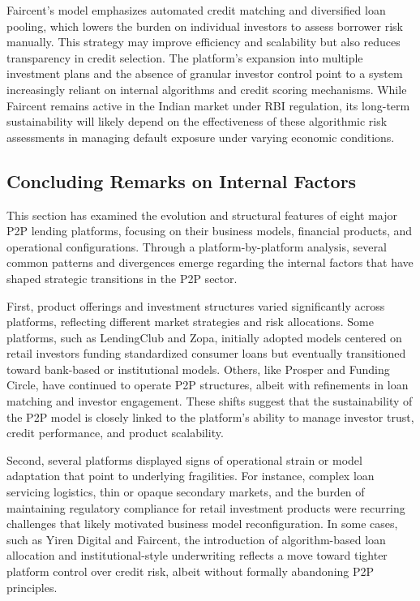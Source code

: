 \documentclass[pdflatex,sn-apa]{sn-jnl}%
\theoremstyle{thmstyleone}%
\theoremstyle{thmstyletwo}%
\theoremstyle{thmstylethree}%
\begin{document}
Faircent’s model emphasizes automated credit matching and diversified loan pooling, which lowers the burden on individual investors to assess borrower risk manually. This strategy may improve efficiency and scalability but also reduces transparency in credit selection. The platform’s expansion into multiple investment plans and the absence of granular investor control point to a system increasingly reliant on internal algorithms and credit scoring mechanisms. While Faircent remains active in the Indian market under RBI regulation, its long-term sustainability will likely depend on the effectiveness of these algorithmic risk assessments in managing default exposure under varying economic conditions.

\subsection{Concluding Remarks on Internal Factors}
This section has examined the evolution and structural features of eight major P2P lending platforms, focusing on their business models, financial products, and operational configurations. Through a platform-by-platform analysis, several common patterns and divergences emerge regarding the internal factors that have shaped strategic transitions in the P2P sector.

First, product offerings and investment structures varied significantly across platforms, reflecting different market strategies and risk allocations. Some platforms, such as LendingClub and Zopa, initially adopted models centered on retail investors funding standardized consumer loans but eventually transitioned toward bank-based or institutional models. Others, like Prosper and Funding Circle, have continued to operate P2P structures, albeit with refinements in loan matching and investor engagement. These shifts suggest that the sustainability of the P2P model is closely linked to the platform’s ability to manage investor trust, credit performance, and product scalability.

Second, several platforms displayed signs of operational strain or model adaptation that point to underlying fragilities. For instance, complex loan servicing logistics, thin or opaque secondary markets, and the burden of maintaining regulatory compliance for retail investment products were recurring challenges that likely motivated business model reconfiguration. In some cases, such as Yiren Digital and Faircent, the introduction of algorithm-based loan allocation and institutional-style underwriting reflects a move toward tighter platform control over credit risk, albeit without formally abandoning P2P principles.
\end{document}
